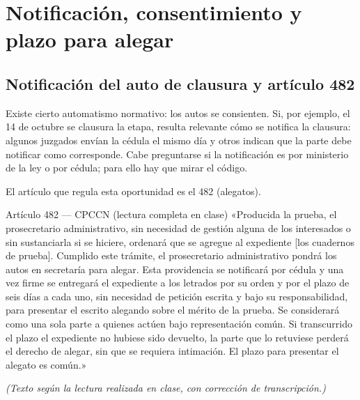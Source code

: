 \documentclass[12pt,oneside]{book}
\begin{document}
\chapter[Consentimiento y plazo de alegar]{Notificación, consentimiento y plazo para alegar}

\section{Notificación del auto de clausura y artículo 482}

Existe cierto automatismo normativo: los autos se consienten. Si, por ejemplo, el 14 de octubre se clausura la etapa, resulta relevante cómo se notifica la clausura: algunos juzgados envían la cédula el mismo día y otros indican que la parte debe notificar como corresponde. Cabe preguntarse si la notificación es por ministerio de la ley o por cédula; para ello hay que mirar el código.

El artículo que regula esta oportunidad es el 482 (alegatos).

\begin{norma}{Artículo 482 --- CPCCN (lectura completa en clase)}
«Producida la prueba, el prosecretario administrativo, sin necesidad de gestión alguna de los interesados o sin sustanciarla si se hiciere, ordenará que se agregue al expediente [los cuadernos de prueba]. Cumplido este trámite, el prosecretario administrativo pondrá los autos en secretaría para alegar. Esta providencia se notificará por cédula y una vez firme se entregará el expediente a los letrados por su orden y por el plazo de seis días a cada uno, sin necesidad de petición escrita y bajo su responsabilidad, para presentar el escrito alegando sobre el mérito de la prueba. Se considerará como una sola parte a quienes actúen bajo representación común. Si transcurrido el plazo el expediente no hubiese sido devuelto, la parte que lo retuviese perderá el derecho de alegar, sin que se requiera intimación. El plazo para presentar el alegato es común.»

\textit{(Texto según la lectura realizada en clase, con corrección de transcripción.)}
\end{norma}
\end{document}
